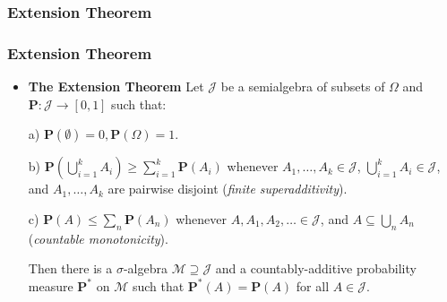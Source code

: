 \documentclass[%
]{beamer}
\newcommand{\BP}{\mathbf{P}}
\begin{document}
\subsubsection{Extension Theorem}
\frame
{
  \frametitle{Extension Theorem}

   \begin{itemize}

             \item<1-> [] \begin{Theorem} \textbf{The Extension Theorem}  Let $\mathcal{J}$ be a semialgebra of subsets of $\Omega$ and $\mathbf{P} : \mathcal{J} \to [0,1]$ such that:
             \newline
             
             a) $\mathbf{P} (\emptyset)=0, \mathbf{P}(\Omega)=1$.
                 \newline
         
             b) $\BP(\bigcup_{i=1}^k A_i)\geq \sum_{i=1}^k \BP(A_i)$ whenever $A_1,\ldots,A_k \in\mathcal{J}$, $\bigcup_{i=1}^k A_i  \in\mathcal{J}$, and $A_1,\ldots,A_k$ are pairwise disjoint (\textit{finite superadditivity}).
                   \newline
       
             c) $\BP(A)\leq \sum_{n} \BP(A_n)$ whenever $A,A_1,A_2,\ldots \in\mathcal{J}$, and $A\subseteq \bigcup_{n} A_n$ (\textit{countable monotonicity}).               
             \newline
             
             Then there is a $\sigma$-algebra $\mathcal{M} \supseteq \mathcal{J}$ and a countably-additive probability measure $\BP^*$ on $\mathcal{M}$ such that $\BP^*(A)=\BP(A)$ for all $A\in \mathcal{J}$.
             \end{Theorem}    
       
                
                 \end{itemize}
}
\end{document}
